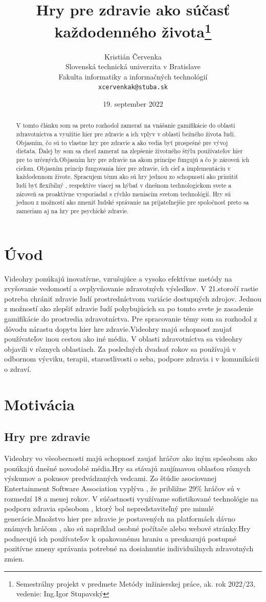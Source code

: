 \documentclass[10pt,oneside,slovak,a4paper]{article}
\title{Hry pre zdravie ako súčasť každodenného života\thanks{Semestrálny projekt v predmete Metódy inžinierskej práce, ak. rok 2022/23, vedenie: Ing.Igor Stupavský}} %
\author{Kristián Červenka\\[2pt]
	{\small Slovenská technická univerzita v Bratislave}\\
	{\small Fakulta informatiky a informačných technológií}\\
	{\small \texttt{xcervenkak@stuba.sk}}
	}
\date{\small 19. september 2022} %
\begin{document}
\maketitle

\begin{abstract}
V tomto článku som sa preto rozhodol zamerať na vnášanie gamifikácie do oblasti zdravotníctva a využitie hier pre zdravie a ich vplyv v oblasti bežného života ľudí.
Objasním, čo sú to vlastne hry pre zdravie a ako vedia byť prospešné pre vývoj dieťaťa.
Ďalej by som sa chcel zamerať na zlepšenie životného štýlu používateľov hier pre to určených.Objasním hry pre zdravie na akom princípe fungujú a čo je zároveň ich cieľom.
Objasním princíp fungovania hier pre zdravie, ich cieľ a implementáciu v každodennom živote.
Spracujem tému ako sú hry jednou zo schopností ako prinútiť ľudí byť flexibilný , respektíve viacej sa hýbať v dnešnom technologickom svete a zároveň sa proaktívne vysporiadať s rýchlo meniacim svetom technológií. 
Hry sú jednou z možností ako zmeniť ľudské správanie na prijateľnejšie pre spoločnosť preto sa zameriam aj na hry pre psychické zdravie.
\end{abstract}



\section{Úvod}
Videohry ponúkajú inovatívne, vzrušujúce a vysoko efektívne metódy na zvyšovanie vedomostí a ovplyvňovanie zdravotných výsledkov. 
V 21.storočí rastie potreba chrániť zdravie ľudí prostredníctvom variácie dostupných zdrojov.
Jednou z možností ako zlepšiť zdravie ľudí pohybujúcich sa po tomto svete je zasadenie gamifikácie do prostredia zdravotníctva. 
Pre spracovanie témy som sa rozhodol z dôvodu nárastu dopytu hier hre zdravie.Videohry majú schopnosť zaujať používateľov inou cestou ako iné média.
V oblasti zdravotníctva sa videohry objavili v rôznych oblastiach. 
Za posledných dvadsať rokov sa používajú v odbornom výcviku, terapii, starostlivosti o seba, podpore zdravia i v komunikácii o zdraví.


\section{Motivácia} 
\subsection{Hry pre zdravie}
Videohry vo všeobecnosti majú schopnosť zaujať hráčov ako iným spôsobom ako ponúkajú dnešné novodobé média.Hry sa stávajú zaujímavou oblasťou rôznych výskumov a pokusov predvádzaných vedcami. Zo štúdie asociovanej Entertainment Software Association \cite{PLP-Framework} vyplýva , že približne 29\% hráčov sú v rozmedzí 18 a menej rokov. 
V súčastnosti využívame sofistikované technológie na podporu zdravia spôsobom , ktorý bol nepredstaviteľný pre minulé generácie.Množstvo hier pre zdravie je postavených na platformách dávno známych hráčom , ako sú napríklad osobné počítače alebo webové stránky.Hry podnecujú ich používateľov k opakovanému hraniu a preukazujú postupné  pozitívne zmeny správania potrebné na dosiahnutie individuálnych zdravotných zmien.
\end{document}
